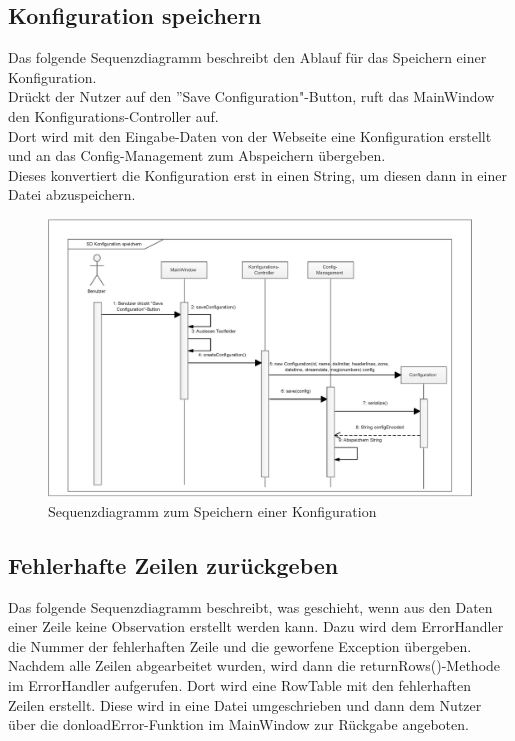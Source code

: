 \subsection{Konfiguration speichern}
Das folgende Sequenzdiagramm beschreibt den Ablauf für das Speichern einer Konfiguration.\\
Drückt der Nutzer auf den ”{Save Configuration}"{-Button}, ruft das MainWindow den Konfigurations-Controller auf.\\
Dort wird mit den Eingabe-Daten von der Webseite eine Konfiguration erstellt und an das Config-Management zum Abspeichern übergeben.\\
Dieses konvertiert die Konfiguration erst in einen String, um diesen dann in einer Datei abzuspeichern.
\vspace{\fill}
\begin{figure}[htbp]
\centering
\includegraphics[scale=0.5]{uml/SD_saveConfig.eps}
\caption{Sequenzdiagramm zum Speichern einer Konfiguration}
\end{figure}

\vspace{\fill}
\clearpage
\subsection{Fehlerhafte Zeilen zurückgeben}
Das folgende Sequenzdiagramm beschreibt, was geschieht, wenn aus den Daten einer Zeile keine Observation erstellt werden kann.
Dazu wird dem ErrorHandler die Nummer der fehlerhaften Zeile und die geworfene Exception übergeben.\\
Nachdem alle Zeilen abgearbeitet wurden, wird dann die returnRows()-Methode im ErrorHandler aufgerufen.
Dort wird eine RowTable mit den fehlerhaften Zeilen erstellt.
Diese wird in eine Datei umgeschrieben und dann dem Nutzer über die donloadError-Funktion im MainWindow zur Rückgabe angeboten.

